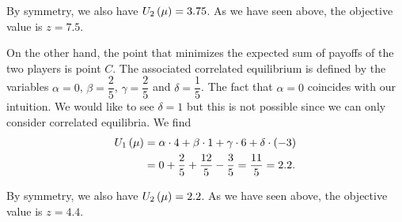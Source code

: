 By symmetry, we also have $U_2 \left(\mu\right) = 3.75$.
As we have seen above, the objective value is $z = 7.5$.


\vspace{5mm}


On the other hand, the point that minimizes the expected sum of payoffs of the two players is point $C$.
The associated correlated equilibrium is defined by the variables $\alpha = 0$, $\beta = \dfrac{2}{5}$, $\gamma = \dfrac{2}{5}$ and $\delta = \dfrac{1}{5}$. The fact that $\alpha = 0$ coincides with our intuition. We would like to see $\delta = 1$ but this is not possible since we can only consider correlated equilibria.
We find 
\begin{align*}
    U_1 \left(\mu\right)
    &= \alpha \cdot 4 + \beta \cdot 1 + \gamma \cdot 6 + \delta \cdot \left(-3\right) \\
    &= 0 + \dfrac{2}{5} + \dfrac{12}{5} - \dfrac{3}{5}
    = \dfrac{11}{5} = 2.2.
\end{align*}

By symmetry, we also have $U_2 \left(\mu\right) = 2.2$.
As we have seen above, the objective value is $z = 4.4$.

